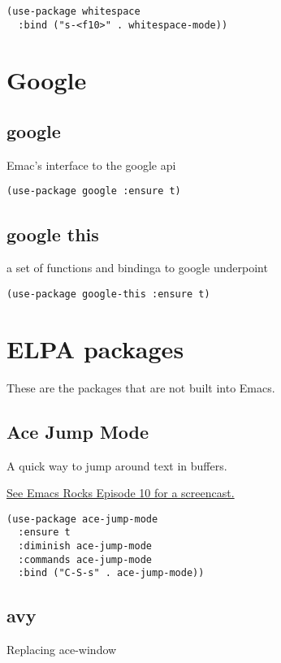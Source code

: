 \documentclass[11pt]{article}
\begin{document}
\begin{verbatim}
(use-package whitespace
  :bind ("s-<f10>" . whitespace-mode))
\end{verbatim}

\section{Google}
\label{sec-17}
\subsection{google}
\label{sec-17-1}

Emac's interface to the google api
\begin{verbatim}
(use-package google :ensure t)
\end{verbatim}

\subsection{google this}
\label{sec-17-2}

a set of functions and bindinga to google underpoint
\begin{verbatim}
(use-package google-this :ensure t)
\end{verbatim}
\section{ELPA packages}
\label{sec-18}

These are the packages that are not built into Emacs.

\subsection{Ace Jump Mode}
\label{sec-18-1}

A quick way to jump around text in buffers.

\href{http://emacsrocks.com/e10.html}{See Emacs Rocks Episode 10 for a screencast.}

\begin{verbatim}
(use-package ace-jump-mode
  :ensure t
  :diminish ace-jump-mode
  :commands ace-jump-mode
  :bind ("C-S-s" . ace-jump-mode))
\end{verbatim}
\subsection{avy}
\label{sec-18-2}

Replacing ace-window
\end{document}
